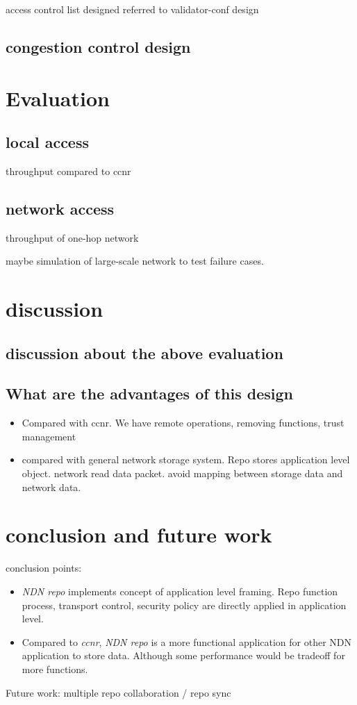 \documentclass[conference]{IEEEtran}
\begin{document}
access control list designed referred to validator-conf design

\subsection{congestion control design}

\section{Evaluation} \label{section-evaluation}

\subsection{local access}
throughput compared to ccnr

\subsection{network access}
throughput of one-hop network

maybe simulation of large-scale network to test failure cases.

\section{discussion} \label{section-discussion}
\subsection{discussion about the above evaluation}

\subsection{What are the advantages of this design}

\begin{itemize}
\item Compared with ccnr. We have remote operations, removing functions, trust management
\item compared with general network storage system. Repo stores application level object. network read data packet. avoid mapping between storage data and network data.
\end{itemize}

\section{conclusion and future work} \label{section-conclusion}
conclusion points:
\begin{itemize}
\item \emph{NDN repo} implements concept of application level framing. Repo function process, transport control, security policy are directly applied in application level.
\item Compared to \emph{ccnr}, \emph{NDN repo} is a more functional application for other NDN application to store data. Although some performance would be tradeoff for more functions.
\end{itemize}

Future work: multiple repo collaboration / repo sync



\end{document}
